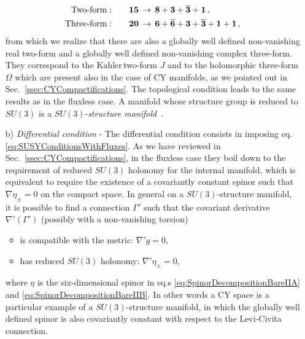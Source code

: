 \documentclass[12pt,a4paper]{book}
\newcommand{\Kahler}{\ensuremath{\text{K}\ddot{\text{a}}\text{hler}\,}}
\begin{document}
\begin{itemize}
\begin{align}
\text{Two-form}: &\quad &&\bf{15} \, \rightarrow \, \bf{8} + \bf{3} + \bf{\overline{3}} + \bf{1}\,, \nonumber \\
\text{Three-form}: &\quad &&\bf{20} \, \rightarrow \, \bf{6} + \bf{\overline{6}} + \bf{3} + \bf{\overline{3}} + \bf{1} + \bf{1}\,,
\end{align}
from which we realize that there are also a globally well defined non-vanishing real two-form and a globally well defined non-vanishing complex three-form. They correspond to the \Kahler two-form $J$ and to the holomorphic three-form $\Omega$ which are present also in the case of CY manifolds, as we pointed out in Sec.~\ref{ssec:CYCompactifications}. The topological condition leads to the same results as in the fluxless case. A manifold whose structure group is reduced to $SU(3)$ is a $SU(3)$-\textit{structure manifold}~\cite{Kaste:2003dh, Frey:2004rn, Behrndt:2005bv}.
\item[b)] \textit{Differential condition} - The differential condition consists in imposing eq. \eqref{eq:SUSYConditionsWithFluxes}. As we have reviewed in Sec.~\ref{ssec:CYCompactifications}, in the fluxless case they boil down to the requirement of reduced $SU(3)$ holonomy for the internal manifold, which is equivalent to require the existence of a covariantly constant spinor such that $\nabla \eta_\pm = 0$ on the compact space. In general on a $SU(3)$-structure manifold, it is possible to find a connection $\Gamma'$ such that the covariant derivative $\nabla'(\Gamma')$ (possibly with a non-vanishing torsion)~\cite{LopesCardoso:2002vpf, Gauntlett:2003cy, Grana:2004sv}
\begin{itemize}
\item is compatible with the metric: $\nabla' g = 0$,
\item has reduced $SU(3)$ holonomy: $\nabla' \eta_\pm = 0$,
\end{itemize}
where $\eta$ is the six-dimensional spinor in eq.s \eqref{eq:SpinorDecompositionBareIIA} and \eqref{eq:SpinorDecompositionBareIIB}. In other words a CY space is a particular example of a $SU(3)$-structure manifold, in which the globally well defined spinor is also covariantly constant with respect to the Levi-Civita connection.
\end{itemize}
\end{document}
